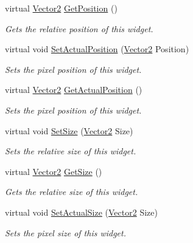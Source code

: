 \begin{DoxyCompactItemize}
virtual \hyperlink{classphys_1_1Vector2}{Vector2} \hyperlink{classphys_1_1UI_1_1Scrollbar_ad049af26ff2247cfcd988cb5639fa003}{GetPosition} ()
\begin{DoxyCompactList}\small\item\em Gets the relative position of this widget. \item\end{DoxyCompactList}\item 
virtual void \hyperlink{classphys_1_1UI_1_1Scrollbar_ad454fa7b60cfc1359961d553389d7b6f}{SetActualPosition} (\hyperlink{classphys_1_1Vector2}{Vector2} Position)
\begin{DoxyCompactList}\small\item\em Sets the pixel position of this widget. \item\end{DoxyCompactList}\item 
virtual \hyperlink{classphys_1_1Vector2}{Vector2} \hyperlink{classphys_1_1UI_1_1Scrollbar_a73337985c0f1f173e253c88705ae5d6e}{GetActualPosition} ()
\begin{DoxyCompactList}\small\item\em Sets the pixel position of this widget. \item\end{DoxyCompactList}\item 
virtual void \hyperlink{classphys_1_1UI_1_1Scrollbar_ae61511d6f1c7afaf27f2551897d3047d}{SetSize} (\hyperlink{classphys_1_1Vector2}{Vector2} Size)
\begin{DoxyCompactList}\small\item\em Sets the relative size of this widget. \item\end{DoxyCompactList}\item 
virtual \hyperlink{classphys_1_1Vector2}{Vector2} \hyperlink{classphys_1_1UI_1_1Scrollbar_aff97ce371ee21fcf3b648dcf8b38e055}{GetSize} ()
\begin{DoxyCompactList}\small\item\em Gets the relative size of this widget. \item\end{DoxyCompactList}\item 
virtual void \hyperlink{classphys_1_1UI_1_1Scrollbar_a0c543abcd12e168d6084471bd0e0420e}{SetActualSize} (\hyperlink{classphys_1_1Vector2}{Vector2} Size)
\begin{DoxyCompactList}\small\item\em Sets the pixel size of this widget. \item\end{DoxyCompactList}\item 

\end{DoxyCompactItemize}
